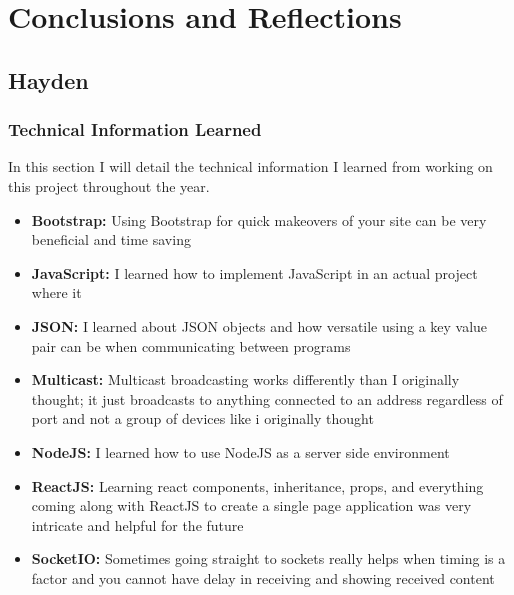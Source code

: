 \documentclass[draftclsnofoot, onecolumn, compsoc, 10pt]{IEEEtran}
\begin{document}
\section{Conclusions and Reflections}
\subsection{Hayden}
\subsubsection{Technical Information Learned}
In this section I will detail the technical information I learned from working on this project throughout the year.
\begin{itemize}
    \item \textbf{Bootstrap:} Using Bootstrap for quick makeovers of your site can be very beneficial and time saving
    \item \textbf{JavaScript:} I learned how to implement JavaScript in an actual project where it
    \item \textbf{JSON:} I learned about JSON objects and how versatile using a key value pair can be when communicating between programs
    \item \textbf{Multicast:} Multicast broadcasting works differently than I originally thought; it just broadcasts to anything connected to an address regardless of port and not a group of devices like i originally thought
    \item \textbf{NodeJS:} I learned how to use NodeJS as a server side environment
    \item \textbf{ReactJS:} Learning react components, inheritance, props, and everything coming along with ReactJS to create a single page application was very intricate and helpful for the future 
    \item \textbf{SocketIO:} Sometimes going straight to sockets really helps when timing is a factor and you cannot have delay in receiving and showing received content
\end{itemize}
\end{document}
